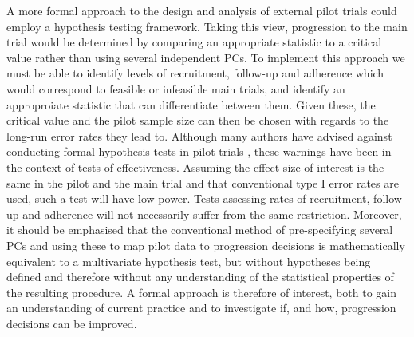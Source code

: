 \documentclass[AMA,STIX1COL]{WileyNJD-v2}
\begin{document}

A more formal approach to the design and analysis of external pilot trials could employ a hypothesis testing framework. Taking this view, progression to the main trial would be determined by comparing an appropriate statistic to a critical value rather than using several independent PCs. To implement this approach we must be able to  identify levels of recruitment, follow-up and adherence which would correspond to feasible or infeasible main trials, and identify an approproiate statistic that can differentiate between them. Given these, the critical value and the pilot sample size can then be chosen with regards to the long-run error rates they lead to. %
Although many authors have advised against conducting formal hypothesis tests in pilot trials \cite{Lancaster2004, Arain2010, Thabane2010, Eldridge2015}, these warnings have been in the context of tests of effectiveness. Assuming the effect size of interest is the same in the pilot and the main trial and that conventional type I error rates are used, such a test will have low power. Tests assessing rates of recruitment, follow-up and adherence will not necessarily suffer from the same restriction. Moreover, it should be emphasised that the conventional method of pre-specifying several PCs and using these to map pilot data to progression decisions is mathematically equivalent to a multivariate hypothesis test, but without hypotheses being defined and therefore without any understanding of the statistical properties of the resulting procedure. A formal approach is therefore of interest, both to gain an understanding of current practice and to investigate if, and how, progression decisions can be improved. %
\end{document}
